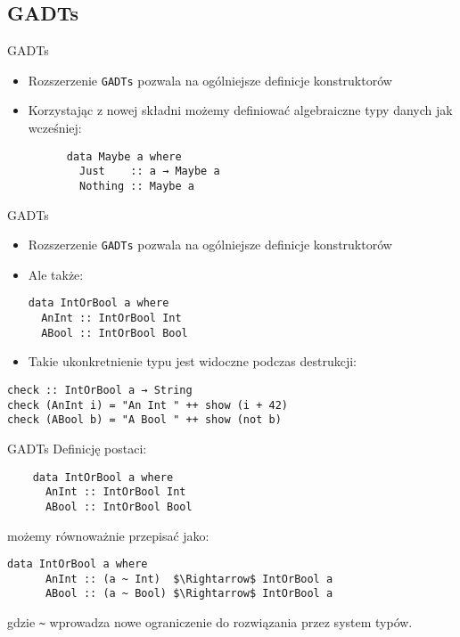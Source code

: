 \documentclass{beamer}
\begin{document}
\subsection{GADTs}
\begin{frame}[fragile]{GADTs}
  \begin{itemize}
    \item Rozszerzenie \lstinline!GADTs! pozwala na ogólniejsze definicje konstruktorów
    \item Korzystając z nowej składni możemy definiować algebraiczne typy danych jak wcześniej:
    \begin{lstlisting}
      data Maybe a where
        Just    :: a → Maybe a
        Nothing :: Maybe a
    \end{lstlisting}
  \end{itemize}
\end{frame}


\begin{frame}[fragile]{GADTs}
  \begin{itemize}
    \item Rozszerzenie \lstinline!GADTs! pozwala na ogólniejsze definicje konstruktorów
    \item Ale także:
    \begin{lstlisting}
data IntOrBool a where
  AnInt :: IntOrBool Int
  ABool :: IntOrBool Bool
    \end{lstlisting}
    \item Takie ukonkretnienie typu jest widoczne podczas destrukcji:
  \end{itemize}
\begin{lstlisting}
check :: IntOrBool a → String
check (AnInt i) = "An Int " ++ show (i + 42)
check (ABool b) = "A Bool " ++ show (not b) 
\end{lstlisting}
\end{frame}


\begin{frame}[fragile]{GADTs}
  Definicję postaci:
  \begin{lstlisting}
    data IntOrBool a where
      AnInt :: IntOrBool Int
      ABool :: IntOrBool Bool
  \end{lstlisting}
  możemy równoważnie przepisać jako:
  \begin{lstlisting}[mathescape]
    data IntOrBool a where
      AnInt :: (a ~ Int)  $\Rightarrow$ IntOrBool a
      ABool :: (a ~ Bool) $\Rightarrow$ IntOrBool a
  \end{lstlisting}
  gdzie \lstinline{~} wprowadza nowe ograniczenie do rozwiązania przez system typów.
\end{frame}
\end{document}
